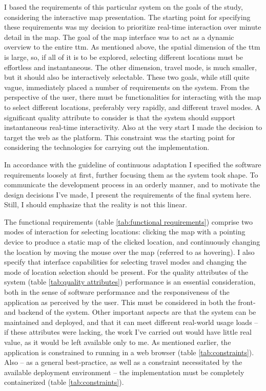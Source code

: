 I based the requirements of this particular system on the goals of the study,
considering the interactive map presentation.
The starting point for specifying these requirements
was my decision to prioritize real-time interaction over minute detail in the map.
The goal of the map interface was to act as a dynamic overview to the entire \acrshort{ttm}.
As mentioned above, the spatial dimension of the \acrshort{ttm} is large,
so, if all of it is to be explored,
selecting different locations must be effortless and instantaneous.
The other dimension, travel mode, is much smaller,
but it should also be interactively selectable.
These two goals, while still quite vague,
immediately placed a number of requirements on the system.
From the perspective of the user,
there must be functionalities for interacting with the map to
select different locations, preferably very rapidly,
and different travel modes.
A significant quality attribute to consider is that the system should
support instantaneous real-time interactivity.
Also at the very start I made the decision to target the web as the platform.
This constraint was the starting point for considering the technologies
for carrying out the implementation.

In accordance with the guideline of continuous adaptation
\parencite{bec2001} I specified the software requirements loosely at first,
further focusing them as the system took shape.
To communicate the development process in an orderly manner,
and to motivate the design decisions I've made, I present
the requirements of the final system here.
Still, I should emphasize that the reality is not this linear.

The functional requirements (table \ref{tab:functional requirements})
comprise two modes of interaction for selecting locations:
clicking the map with a pointing device to produce a static map of the clicked location,
and continuously changing the location by moving the mouse over the map
(referred to as hovering).
I also specify that interface capabilities for selecting travel modes
and changing the mode of location selection should be present.
For the quality attributes of the system (table \ref{tab:quality attributes})
performance is an essential consideration,
both in the sense of software performance
and the responsiveness of the application as perceived by the user.
This must be considered in both the front- and backend of the system.
Other important aspects are that the system can be maintained and deployed,
and that it can meet different real-world usage loads --
if these attributes were lacking,
the work I've carried out would have little real value,
as it would be left available only to me.
As mentioned earlier,
the application is constrained to running in a web browser (table \ref{tab:constraints}).
Also -- as a general best-practice, as well as a constraint
necessitated by the available deployment environment --  %
the implementation must be completely containerized (table \ref{tab:constraints}).

